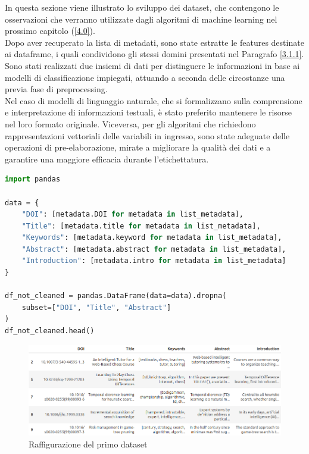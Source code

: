 In questa sezione viene illustrato lo sviluppo dei dataset, che contengono le osservazioni che verranno utilizzate dagli algoritmi di machine learning nel prossimo capitolo (\ref{4.0}). \vspace{7pt} \\
Dopo aver recuperato la lista di metadati, sono state estratte le features destinate ai dataframe, i quali condividono gli stessi domini presentati nel Paragrafo \ref{3.1.1}. Sono stati realizzati due insiemi di dati per distinguere le informazioni in base ai modelli di classificazione impiegati, attuando a seconda delle circostanze una previa fase di preprocessing. \vspace{7pt} \\
Nel caso di modelli di linguaggio naturale, che si formalizzano sulla comprensione e interpretazione di informazioni testuali, è stato preferito mantenere le risorse nel loro formato originale. Viceversa, per gli algoritmi che richiedono rappresentazioni vettoriali delle variabili in ingresso, sono state adeguate delle operazioni di pre-elaborazione, mirate a migliorare la qualità dei dati e a garantire una maggiore efficacia durante l'etichettatura.
\begin{lstlisting}[language=python, caption=Creazione del primo dataset]
import pandas

data = {
    "DOI": [metadata.DOI for metadata in list_metadata],
    "Title": [metadata.title for metadata in list_metadata],
    "Keywords": [metadata.keyword for metadata in list_metadata],
    "Abstract": [metadata.abstract for metadata in list_metadata],
    "Introduction": [metadata.intro for metadata in list_metadata]
}

df_not_cleaned = pandas.DataFrame(data=data).dropna(
    subset=["DOI", "Title", "Abstract"]
)
df_not_cleaned.head()
\end{lstlisting}
\begin{figure}[h]
    \centering
    \includegraphics[width=1.0\textwidth]{img/img5.png}
    \caption{Raffigurazione del primo dataset}
    \label{fig:3.3-3.2}
\end{figure}
